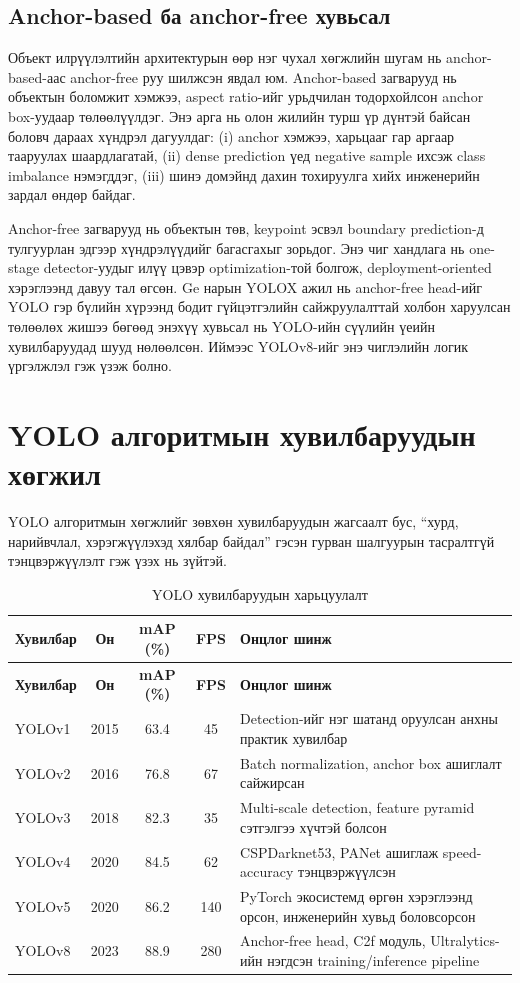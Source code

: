 \subsection{Anchor-based ба anchor-free хувьсал}
Объект илрүүлэлтийн архитектурын өөр нэг чухал хөгжлийн шугам нь anchor-based-аас anchor-free руу шилжсэн явдал юм. Anchor-based загварууд нь объектын боломжит хэмжээ, aspect ratio-ийг урьдчилан тодорхойлсон anchor box-уудаар төлөөлүүлдэг. Энэ арга нь олон жилийн турш үр дүнтэй байсан боловч дараах хүндрэл дагуулдаг: (i) anchor хэмжээ, харьцааг гар аргаар тааруулах шаардлагатай, (ii) dense prediction үед negative sample ихсэж class imbalance нэмэгддэг, (iii) шинэ домэйнд дахин тохируулга хийх инженерийн зардал өндөр байдаг.

Anchor-free загварууд нь объектын төв, keypoint эсвэл boundary prediction-д тулгуурлан эдгээр хүндрэлүүдийг багасгахыг зорьдог. Энэ чиг хандлага нь one-stage detector-уудыг илүү цэвэр optimization-той болгож, deployment-oriented хэрэглээнд давуу тал өгсөн. Ge нарын YOLOX ажил нь anchor-free head-ийг YOLO гэр бүлийн хүрээнд бодит гүйцэтгэлийн сайжруулалттай холбон харуулсан төлөөлөх жишээ бөгөөд \cite{yolox} энэхүү хувьсал нь YOLO-ийн сүүлийн үеийн хувилбаруудад шууд нөлөөлсөн. Иймээс YOLOv8-ийг энэ чиглэлийн логик үргэлжлэл гэж үзэж болно.

\section{YOLO алгоритмын хувилбаруудын хөгжил}
YOLO алгоритмын хөгжлийг зөвхөн хувилбаруудын жагсаалт бус, ``хурд, нарийвчлал, хэрэгжүүлэхэд хялбар байдал'' гэсэн гурван шалгуурын тасралтгүй тэнцвэржүүлэлт гэж үзэх нь зүйтэй.

\begin{longtable}{|l|c|c|c|p{5.2cm}|}
\caption{YOLO хувилбаруудын харьцуулалт}
\label{tab:yolo_versions}\\
\hline
\textbf{Хувилбар} & \textbf{Он} & \textbf{mAP (\%)} & \textbf{FPS} & \textbf{Онцлог шинж} \\
\hline
\endfirsthead
\hline
\textbf{Хувилбар} & \textbf{Он} & \textbf{mAP (\%)} & \textbf{FPS} & \textbf{Онцлог шинж} \\
\hline
\endhead
\hline
\endfoot
YOLOv1 & 2015 & 63.4 & 45 & Detection-ийг нэг шатанд оруулсан анхны практик хувилбар \cite{yolo_original} \\
\hline
YOLOv2 & 2016 & 76.8 & 67 & Batch normalization, anchor box ашиглалт сайжирсан \cite{yolov2} \\
\hline
YOLOv3 & 2018 & 82.3 & 35 & Multi-scale detection, feature pyramid сэтгэлгээ хүчтэй болсон \cite{yolov3} \\
\hline
YOLOv4 & 2020 & 84.5 & 62 & CSPDarknet53, PANet ашиглаж speed-accuracy тэнцвэржүүлсэн \cite{yolov4} \\
\hline
YOLOv5 & 2020 & 86.2 & 140 & PyTorch экосистемд өргөн хэрэглээнд орсон, инженерийн хувьд боловсорсон \\
\hline
YOLOv8 & 2023 & 88.9 & 280 & Anchor-free head, C2f модуль, Ultralytics-ийн нэгдсэн training/inference pipeline \cite{yolov8_ultralytics} \\
\hline
\end{longtable}

